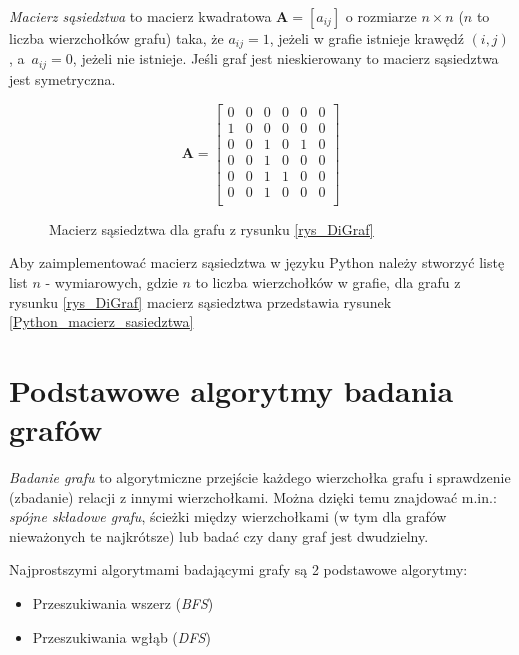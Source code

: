 \documentclass[12pt,a4paper]{book}
\theoremstyle{definition}
\newcommand{\bb}{\boldsymbol}
\numberwithin{equation}{chapter}
\begin{document}


\textit{Macierz sąsiedztwa} to macierz kwadratowa $\bb A = [a_{ij}]$ o rozmiarze $n \times n$ ($n$ to liczba wierzchołków grafu) taka, że $a_{ij} = 1$, jeżeli w grafie istnieje krawędź $(i,j)$, a~$a_{ij} = 0$, jeżeli nie istnieje. Jeśli graf jest nieskierowany to macierz sąsiedztwa jest symetryczna. 

\begin{figure}[H]
$$
\bb A = 
\begin{bmatrix}
0 & 0 & 0 & 0 & 0 & 0\\
1 & 0 & 0 & 0 & 0 & 0\\
0 & 0 & 1 & 0 & 1 & 0\\
0 & 0 & 1 & 0 & 0 & 0\\
0 & 0 & 1 & 1 & 0 & 0\\
0 & 0 & 1 & 0 & 0 & 0\\
\end{bmatrix}
$$
\caption{Macierz sąsiedztwa dla grafu z rysunku \ref{rys_DiGraf}}
\label{macierz}
\end{figure}

Aby zaimplementować macierz sąsiedztwa w języku Python należy stworzyć listę list $n$ - wymiarowych, gdzie $n$ to liczba wierzchołków w grafie, dla grafu z rysunku \ref{rys_DiGraf} macierz sąsiedztwa przedstawia rysunek \ref{Python_macierz_sasiedztwa}



\section{Podstawowe algorytmy badania grafów}
\textit{Badanie grafu} to algorytmiczne przejście każdego wierzchołka grafu i sprawdzenie (zbadanie) relacji z innymi wierzchołkami. Można dzięki temu znajdować m.in.: \textit{spójne składowe grafu}, ścieżki między wierzchołkami (w tym dla grafów nieważonych te najkrótsze) lub badać czy dany graf jest dwudzielny.

Najprostszymi algorytmami badającymi grafy są 2 podstawowe algorytmy:
\begin{itemize}
\item Przeszukiwania wszerz (\textit{BFS})
\item Przeszukiwania wgłąb (\textit{DFS})
\end{itemize}
\end{document}

